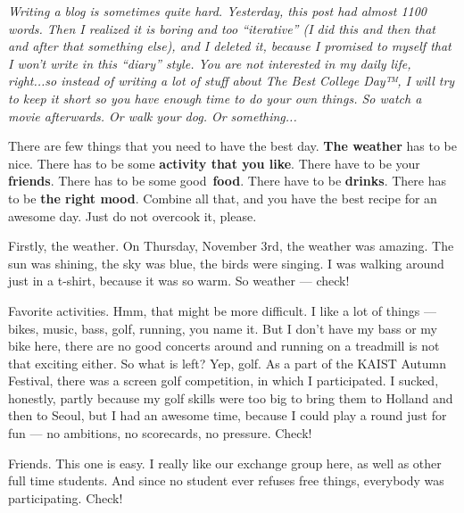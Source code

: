 \begin{post}
	\begin{content}
\textit{Writing a blog is sometimes quite hard. Yesterday, this post had almost 1100 words. Then I realized it is boring and too ``iterative'' (I did this and then that and after that something else), and I deleted it, because I promised to myself that I won't write in this ``diary'' style. You are not interested in my daily life, right...so instead of writing a lot of stuff about The Best College Day™, I will try to keep it short so you have enough time to do your own things. So watch a movie afterwards. Or walk your dog. Or something...}

There are few things that you need to have the best day. \textbf{The weather} has to be nice. There has to be some \textbf{activity that you like}. There have to be your \textbf{friends}. There has to be some good \textbf{food}. There have to be \textbf{drinks}. There has to be\textbf{ the right mood}. Combine all that, and you have the best recipe for an awesome day. Just do not overcook it, please.

Firstly, the weather. On Thursday, November 3rd, the weather was amazing. The sun was shining, the sky was blue, the birds were singing. I was walking around just in a t-shirt, because it was so warm. So weather — \textcolor{Chameleon}{check!}

Favorite activities. Hmm, that might be more difficult. I like a lot of things — bikes, music, bass, golf, running, you name it. But I don't have my bass or my bike here, there are no good concerts around and running on a treadmill is not that exciting either. So what is left? Yep, golf. As a part of the KAIST Autumn Festival, there was a screen golf competition, in which I participated. I sucked, honestly, partly because my golf skills were too big to bring them to Holland and then to Seoul, but I had an awesome time, because I could play a round just for fun — no ambitions, no scorecards, no pressure. \textcolor{Chameleon}{Check!}

Friends. This one is easy. I really like our exchange group here, as well as other full time students. And since no student ever refuses free things, everybody was participating. \textcolor{Chameleon}{Check!}

\begin{figure}
\centering{}\vspace{-32pt}
\end{figure}



\end{content}
\end{post}
